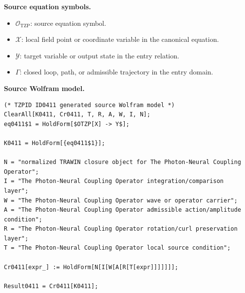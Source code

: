 \begin{minipage}[t]{0.49\linewidth}
\begingroup
\small
\raggedright
\textbf{Source equation symbols.}\par
\begin{itemize}[leftmargin=1.35em,itemsep=1pt,topsep=1pt,parsep=0pt]
    \item $\mathcal{O}_{\mathrm{TZP}}$: source equation symbol.
    \item $\mathcal{X}$: local field point or coordinate variable in the canonical equation.
    \item $\mathcal{Y}$: target variable or output state in the entry relation.
    \item $\Gamma$: closed loop, path, or admissible trajectory in the entry domain.
\end{itemize}
\endgroup
\end{minipage}\hfill
\begin{minipage}[t]{0.47\linewidth}
\begingroup
\scriptsize
\raggedright
\textbf{Source Wolfram model.}\par
\begin{Verbatim}[fontsize=\tiny,breaklines=true,breakanywhere=true]
(* TZPID ID0411 generated source Wolfram model *)
ClearAll[K0411, Cr0411, T, R, A, W, I, N];
eq0411$1 = HoldForm[$OTZP[X] -> Y$];

K0411 = HoldForm[{eq0411$1}];

N = "normalized TRAWIN closure object for The Photon-Neural Coupling Operator";
I = "The Photon-Neural Coupling Operator integration/comparison layer";
W = "The Photon-Neural Coupling Operator wave or operator carrier";
A = "The Photon-Neural Coupling Operator admissible action/amplitude condition";
R = "The Photon-Neural Coupling Operator rotation/curl preservation layer";
T = "The Photon-Neural Coupling Operator local source condition";

Cr0411[expr_] := HoldForm[N[I[W[A[R[T[expr]]]]]]];

Result0411 = Cr0411[K0411];
\end{Verbatim}
\endgroup
\end{minipage}


